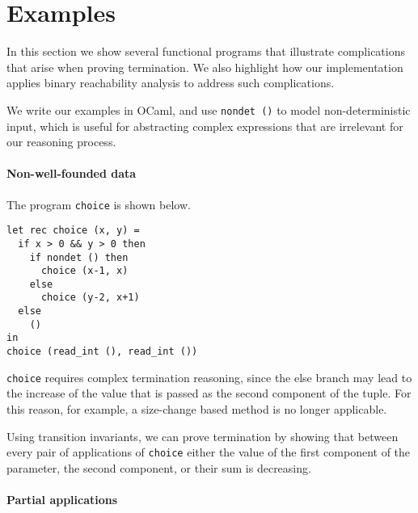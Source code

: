 \section{Examples}

In this section we show several functional programs that illustrate
complications that arise when proving termination.  We also highlight
how our implementation applies binary reachability analysis to address
such complications.

We write our examples in OCaml, and use \texttt{nondet ()} to model
non-deterministic input, which is useful for abstracting complex
expressions that are irrelevant for our reasoning process.

\paragraph{\bf Non-well-founded data}

The program \texttt{choice} is shown below.
%
\begin{center}
\begin{minipage}[h]{.5\linewidth}
\begin{small}
\begin{verbatim}
let rec choice (x, y) = 
  if x > 0 && y > 0 then
    if nondet () then 
      choice (x-1, x)
    else 
      choice (y-2, x+1)
  else 
    ()
in
choice (read_int (), read_int ())
\end{verbatim}
\end{small}
\end{minipage}
\end{center}
%
\texttt{choice} requires complex termination reasoning, since the else
branch may lead to the increase of the value that is passed as the
second component of the tuple. 
For this reason, for example, a size-change based method is no longer
applicable.

Using transition invariants, we can prove termination by showing that
between every pair of applications of \texttt{choice} either the value
of the first component of the parameter, the second component, or
their sum is decreasing.

\paragraph{\bf Partial applications}

